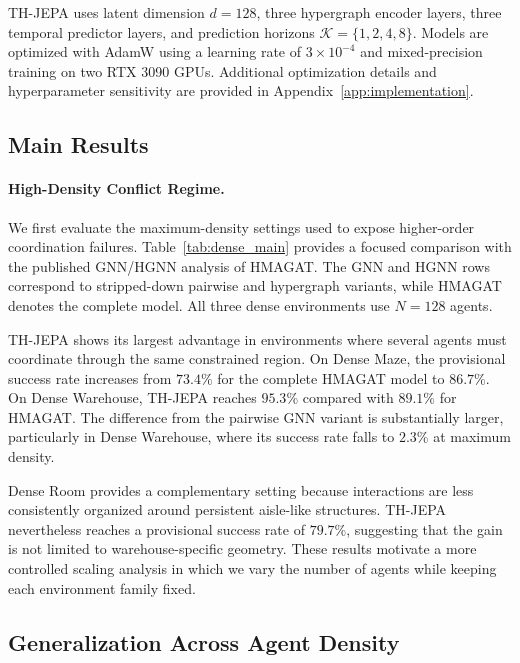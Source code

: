 \documentclass{article} %
\begin{document}
TH-JEPA uses latent dimension $d=128$, three hypergraph encoder layers, three temporal predictor layers, and prediction horizons $\mathcal{K}=\{1,2,4,8\}$. Models are optimized with AdamW using a learning rate of $3\times10^{-4}$ and mixed-precision training on two RTX 3090 GPUs. Additional optimization details and hyperparameter sensitivity are provided in Appendix~\ref{app:implementation}.

\subsection{Main Results}
\label{sec:main_results}

\paragraph{High-Density Conflict Regime.}
We first evaluate the maximum-density settings used to expose higher-order coordination failures. Table~\ref{tab:dense_main} provides a focused comparison with the published GNN/HGNN analysis of HMAGAT. The GNN and HGNN rows correspond to stripped-down pairwise and hypergraph variants, while HMAGAT denotes the complete model. All three dense environments use $N=128$ agents.



TH-JEPA shows its largest advantage in environments where several agents must coordinate through the same constrained region. On Dense Maze, the provisional success rate increases from $73.4\%$ for the complete HMAGAT model to $86.7\%$. On Dense Warehouse, TH-JEPA reaches $95.3\%$ compared with $89.1\%$ for HMAGAT. The difference from the pairwise GNN variant is substantially larger, particularly in Dense Warehouse, where its success rate falls to $2.3\%$ at maximum density.

Dense Room provides a complementary setting because interactions are less consistently organized around persistent aisle-like structures. TH-JEPA nevertheless reaches a provisional success rate of $79.7\%$, suggesting that the gain is not limited to warehouse-specific geometry. These results motivate a more controlled scaling analysis in which we vary the number of agents while keeping each environment family fixed.

\subsection{Generalization Across Agent Density}
\label{sec:generalization}
\end{document}
